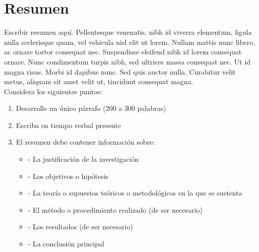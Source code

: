 
\newpage
\clearpage{\pagestyle{empty}\cleardoublepage}
\newpage

\pagestyle{empty}
\newpage
\chapter*{\centering \large Resumen} 
{Escribir resumen aquí. Pellentesque venenatis, nibh id viverra elementum, ligula nulla scelerisque quam, vel vehicula nisl elit ut lorem. Nullam mattis nunc libero, ac ornare tortor consequat nec. Suspendisse eleifend nibh id lorem consequat ornare. Nunc condimentum turpis nibh, sed ultrices massa consequat nec. Ut id magna risus. Morbi id dapibus nunc. Sed quis auctor nulla. Curabitur velit metus, aliquam sit amet velit ut, tincidunt consequat magna.}\\[0.5cm]

Considera los siguientes puntos:
\begin{enumerate}
	\item Desarrolle un único párrafo (200 a 300 palabras)
	\item Escriba en tiempo verbal presente
	\item El resumen debe contener información sobre:
	\begin{itemize}
		\item	- La justificación de la investigación
		\item	- Los objetivos o hipótesis
		\item	- La teoría o supuestos teóricos o metodológicos en la que se sustenta
		\item	- El método o procedimiento realizado (de ser necesario)
		\item	- Los resultados (de ser necesario)
		\item	- La conclusión principal
	\end{itemize}
\end{enumerate}